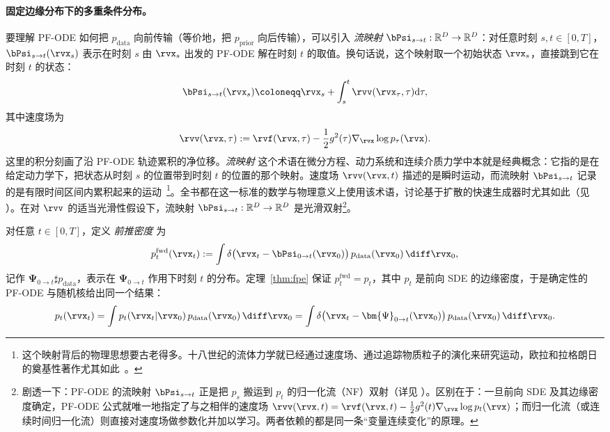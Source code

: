 \paragraph{固定边缘分布下的多重条件分布。}
要理解 PF-ODE 如何把 $p_{\mathrm{data}}$ 向前传输（等价地，把 $p_{\mathrm{prior}}$ 向后传输），可以引入 \emph{流映射} $\bPsi_{s \to t}: \mathbb{R}^D \to \mathbb{R}^D$：对任意时刻 $s, t \in[0,T]$，$\bPsi_{s \to t}(\rvx_s)$ 表示在时刻 $s$ 由 $\rvx_s$ 出发的 PF-ODE 解在时刻 $t$ 的取值。换句话说，这个映射取一个初始状态 $\rvx_s$，直接跳到它在时刻 $t$ 的状态：
\begin{align}\label{eq:flow-map-def}
\bPsi_{s \to t}(\rvx_s) \coloneqq \rvx_s + \int_s^t \rvv(\rvx_\tau, \tau)\mathrm{d}\tau,
\end{align}
其中速度场为
\begin{align*}
\rvv(\rvx, \tau) := \rvf(\rvx, \tau) - \frac{1}{2} g^2(\tau)\nabla_{\rvx}\log p_\tau(\rvx).
\end{align*}
这里的积分刻画了沿 PF-ODE 轨迹累积的净位移。\emph{流映射} 这个术语在微分方程、动力系统和连续介质力学中本就是经典概念：它指的是在给定动力学下，把状态从时刻 $s$ 的位置带到时刻 $t$ 的位置的那个映射。速度场 $\rvv(\rvx,t)$ 描述的是瞬时运动，而流映射 $\bPsi_{s\to t}$ 记录的是有限时间区间内累积起来的运动~\citep{arnold1988geometrical,chorin1993mathematical}\footnote{这个映射背后的物理思想要古老得多。十八世纪的流体力学就已经通过速度场、通过追踪物质粒子的演化来研究运动，欧拉和拉格朗日的奠基性著作尤其如此~\citep{euler1757fluid,lagrange1783fluid}。}。全书都在这一标准的数学与物理意义上使用该术语，讨论基于扩散的快速生成器时尤其如此（见 ）。在对 $\rvv$ 的适当光滑性假设下，流映射 $\bPsi_{s \to t}: \mathbb{R}^D \to \mathbb{R}^D$ 是光滑双射\footnote{%
剧透一下：PF-ODE 的流映射 $\bPsi_{s\to t}$ 正是把 $p_s$ 搬运到 $p_t$ 的归一化流（NF）双射（详见 ）。区别在于：一旦前向 SDE 及其边缘密度确定，PF-ODE 公式就唯一地指定了与之相伴的速度场 $\rvv(\rvx,t) = \rvf(\rvx,t) -\frac{1}{2}g^2(t)\nabla_{\rvx}\log p_t(\rvx)$；而归一化流（或连续时间归一化流）则直接对速度场做参数化并加以学习。两者依赖的都是同一条“变量连续变化”的原理。
}。


对任意 $t\in[0,T]$，定义 \emph{前推密度} 为
\[
p_t^{\mathrm{fwd}}(\rvx_t) := \int \delta\bigl(\rvx_t - \bPsi_{0 \to t}(\rvx_0)\bigr)\, p_{\mathrm{data}}(\rvx_0) \,\diff \rvx_0,
\]
记作 $\bm{\Psi}_{0\to t} \sharp p_{\mathrm{data}}$，表示在 $\bm{\Psi}_{0\to t}$ 作用下时刻 $t$ 的分布。定理~\ref{thm:fpe} 保证 $p_t^{\mathrm{fwd}} = p_t$，其中 $p_t$ 是前向 SDE 的边缘密度，于是确定性的 PF-ODE 与随机核给出同一个结果：
\[
p_t(\rvx_t) = \int p_t(\rvx_t |\rvx_0)\, p_{\mathrm{data}}(\rvx_0)\,\diff \rvx_0
= \int \delta\bigl(\rvx_t - \bm{\Psi}_{0\to t}(\rvx_0)\bigr)\, p_{\mathrm{data}}(\rvx_0)\,\diff \rvx_0.
\]

